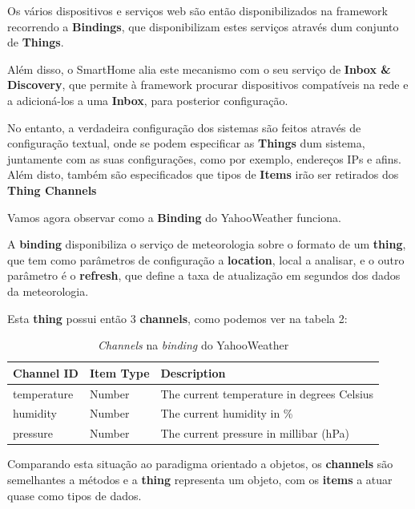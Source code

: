 Os vários dispositivos e serviços web são então disponibilizados na framework recorrendo a \textbf{Bindings}, que disponibilizam estes serviços através dum conjunto de \textbf{Things}.

Além disso, o SmartHome alia este mecanismo com o seu serviço de \textbf{Inbox \& Discovery}, que permite à framework procurar dispositivos compatíveis na rede e a adicioná-los a uma \textbf{Inbox}, para posterior configuração.

No entanto, a verdadeira configuração dos sistemas são feitos através de configuração textual, onde se podem especificar as \textbf{Things} dum sistema, juntamente com as suas configurações, como por exemplo, endereços IPs e afins. Além disto, também são especificados que tipos de \textbf{Items} irão ser retirados dos \textbf{Thing Channels}

Vamos agora observar como a \textbf{Binding} do YahooWeather funciona.

A \textbf{binding} disponibiliza o serviço de meteorologia sobre o formato de um \textbf{thing}, que tem como parâmetros de configuração a \textbf{location}, local a analisar, e o outro parâmetro é o \textbf{refresh}, que define a taxa de atualização em segundos dos dados da meteorologia.

Esta \textbf{thing} possui então 3 \textbf{channels}, como podemos ver na tabela 2:

\begin{table}[H]
\begin{tabular}{lll}
\textbf{Channel ID}                        & \textbf{Item Type}                   & \textbf{Description}                                                     \\ \hline
\multicolumn{1}{|l|}{temperature} & \multicolumn{1}{l|}{Number} & \multicolumn{1}{l|}{The current temperature in degrees Celsius} \\ \hline
\multicolumn{1}{|l|}{humidity}    & \multicolumn{1}{l|}{Number} & \multicolumn{1}{l|}{The current humidity in \%}                 \\ \hline
\multicolumn{1}{|l|}{pressure}    & \multicolumn{1}{l|}{Number} & \multicolumn{1}{l|}{The current pressure in millibar (hPa)}     \\ \hline
\end{tabular}
\caption{\textit{Channels} na \textit{binding} do YahooWeather}
\label{smarthomechannels}
\end{table}

Comparando esta situação ao paradigma orientado a objetos, os \textbf{channels} são semelhantes a métodos e a \textbf{thing} representa um objeto, com os \textbf{items} a atuar quase como tipos de dados.\\\\

